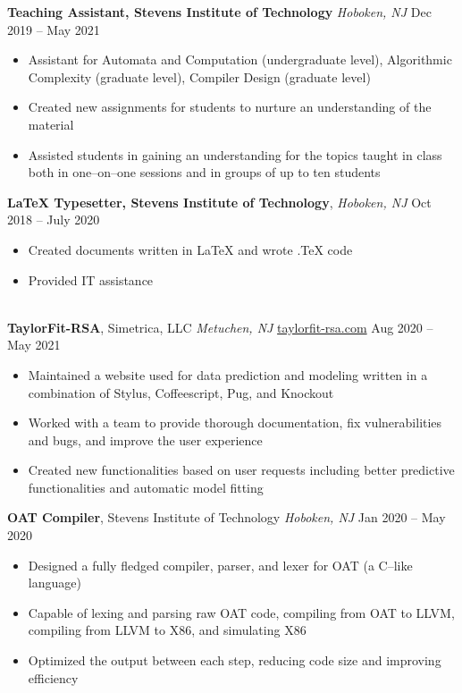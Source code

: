 \documentclass[10pt,letterpaper,roman]{moderncv}
\newcommand*{\mysection}[1]{%
  \vspace{2.5ex}
  \phantomsection{}
  \addcontentsline{toc}{part}{#1}%
  \parbox[m]{\textwidth}{\sectionstyle{#1}}\\[1ex]}
\begin{document}
\hfill

\textbf{Teaching Assistant, Stevens Institute of Technology} \textit{Hoboken, NJ} \hfill Dec 2019 -- May 2021
\begin{itemize}
	\item Assistant for Automata and Computation (undergraduate level), Algorithmic Complexity (graduate level), Compiler Design (graduate level)
	\item Created new assignments for students to nurture an understanding of the material
	\item Assisted students in gaining an understanding for the topics taught in class both in one--on--one sessions and in groups of up to ten students
\end{itemize}

\hfill

\textbf{\LaTeX{} Typesetter, Stevens Institute of Technology}, \textit{Hoboken, NJ} \hfill Oct 2018 -- July 2020
\begin{itemize}
	\item Created documents written in \LaTeX{} and wrote .TeX code
	\item Provided IT assistance
\end{itemize}

\mysection{Projects}
\textbf{TaylorFit-RSA}, Simetrica, LLC \textit{Metuchen, NJ}  \hfill { \color{blue} \href{http://www.taylorfit-rsa.com/}{taylorfit-rsa.com} } Aug 2020 -- May 2021
\begin{itemize}
	\item Maintained a website used for data prediction and modeling written in a combination of Stylus, Coffeescript, Pug, and Knockout
	\item Worked with a team to provide thorough documentation, fix vulnerabilities and bugs, and improve the user experience
	\item Created new functionalities based on user requests including better predictive functionalities and automatic model fitting
\end{itemize}

\hfill

\textbf{OAT Compiler}, Stevens Institute of Technology \textit{Hoboken, NJ} \hfill Jan 2020 -- May 2020
\begin{itemize}
	\item Designed a fully fledged compiler, parser, and lexer for OAT (a C--like language)
	\item Capable of lexing and parsing raw OAT code, compiling from OAT to LLVM, compiling from LLVM to X86, and simulating X86
	\item Optimized the output between each step, reducing code size and improving efficiency
\end{itemize}
\end{document}
